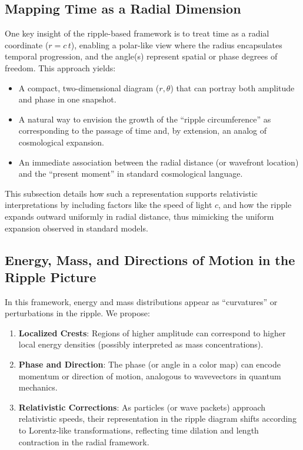 \documentclass[11pt]{article}
\begin{document}
\subsection{Mapping Time as a Radial Dimension}
\label{subsec:time-radial}
One key insight of the ripple-based framework is to treat time as a radial coordinate 
(\(r = c \, t\)), enabling a polar-like view where the radius encapsulates temporal 
progression, and the angle(s) represent spatial or phase degrees of freedom. 
This approach yields:
\begin{itemize}
  \item A compact, two-dimensional diagram (\(r, \theta\)) that can portray both 
        amplitude and phase in one snapshot.
  \item A natural way to envision the growth of the ``ripple circumference'' as 
        corresponding to the passage of time and, by extension, an analog of cosmological expansion.
  \item An immediate association between the radial distance (or wavefront location) 
        and the ``present moment'' in standard cosmological language.
\end{itemize}

This subsection details how such a representation supports relativistic 
interpretations by including factors like the speed of light \(c\), and how 
the ripple expands outward uniformly in radial distance, thus mimicking the 
uniform expansion observed in standard models.

\subsection{Energy, Mass, and Directions of Motion in the Ripple Picture}
\label{subsec:energy-mass}
In this framework, energy and mass distributions appear as ``curvatures'' or 
perturbations in the ripple. We propose:
\begin{enumerate}
  \item \textbf{Localized Crests}: Regions of higher amplitude can correspond to 
        higher local energy densities (possibly interpreted as mass concentrations).
  \item \textbf{Phase and Direction}: The phase (or angle in a color map) can 
        encode momentum or direction of motion, analogous to wavevectors in quantum 
        mechanics. 
  \item \textbf{Relativistic Corrections}: As particles (or wave packets) approach 
        relativistic speeds, their representation in the ripple diagram shifts 
        according to Lorentz-like transformations, reflecting time dilation and 
        length contraction in the radial framework.
\end{enumerate}
\end{document}
